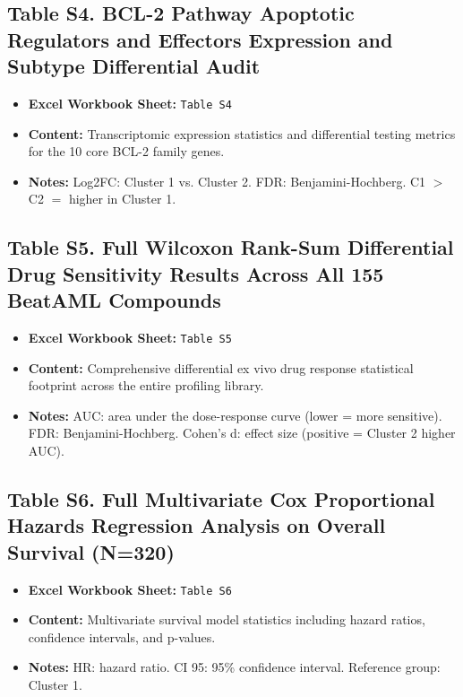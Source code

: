 \documentclass[11pt,a4paper]{article}
\begin{document}
\subsection*{Table S4. BCL-2 Pathway Apoptotic Regulators and Effectors Expression and Subtype Differential Audit}
\hypertarget{tab:tabS4}{}
\label{tab:tabS4}
\begin{itemize}
    \item \textbf{Excel Workbook Sheet:} \texttt{Table S4}
    \item \textbf{Content:} Transcriptomic expression statistics and differential testing metrics for the 10 core BCL-2 family genes.
    \item \textbf{Notes:} Log2FC: Cluster 1 vs. Cluster 2. FDR: Benjamini-Hochberg. C1 $>$ C2 $=$ higher in Cluster 1.
\end{itemize}

\subsection*{Table S5. Full Wilcoxon Rank-Sum Differential Drug Sensitivity Results Across All 155 BeatAML Compounds}
\hypertarget{tab:tabS5}{}
\label{tab:tabS5}
\begin{itemize}
    \item \textbf{Excel Workbook Sheet:} \texttt{Table S5}
    \item \textbf{Content:} Comprehensive differential ex vivo drug response statistical footprint across the entire profiling library.
    \item \textbf{Notes:} AUC: area under the dose-response curve (lower = more sensitive). FDR: Benjamini-Hochberg. Cohen's d: effect size (positive = Cluster 2 higher AUC).
\end{itemize}

\subsection*{Table S6. Full Multivariate Cox Proportional Hazards Regression Analysis on Overall Survival (N=320)}
\hypertarget{tab:tabS6}{}
\label{tab:tabS6}
\begin{itemize}
    \item \textbf{Excel Workbook Sheet:} \texttt{Table S6}
    \item \textbf{Content:} Multivariate survival model statistics including hazard ratios, confidence intervals, and p-values.
    \item \textbf{Notes:} HR: hazard ratio. CI 95: 95\% confidence interval. Reference group: Cluster 1.
\end{itemize}
\end{document}
